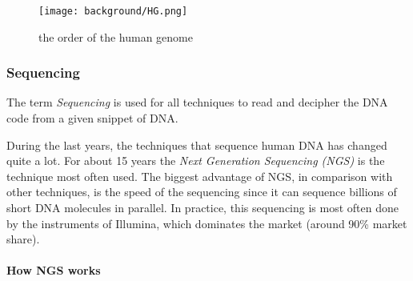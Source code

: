 \begin{figure}[!ht]
	\centering
	\texttt{[image: background/HG.png]}
	\caption{the order of the human genome}
	\label{fig:HG}
\end{figure}

\subsubsection{Sequencing}

The term \emph{Sequencing} is used for all techniques to read and decipher the DNA code from a given snippet of DNA.

During the last years, the techniques that sequence human DNA has changed quite a lot. For about 15 years the \emph{Next Generation Sequencing (NGS)} is the technique most often used. The biggest advantage of NGS, in comparison with other techniques, is the speed of the sequencing since it can sequence billions of short DNA molecules in parallel. In practice, this sequencing is most often done by the instruments of Illumina, which dominates the market (around 90\% market share).

\paragraph{How NGS works}

